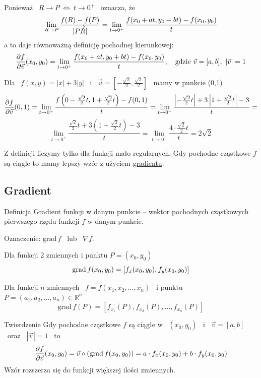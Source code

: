 Ponieważ \ $ R \to P \ \Leftrightarrow \ t \to 0^+ $ \ oznacza, że
\[ \lim_{R \to P} \frac{f(R) - f(P)}{|\overrightarrow{PR}|} = \lim_{t \to 0^+} \frac{f(x_0 + at, y_0 + bt) - f(x_0, y_0)}{t} \]
a to daje równoważną definicję pochodnej kierunkowej:
\[ \frac{\partial f}{\partial \vec{v}} (x_0, y_0) = \lim_{t \to 0^+} \frac{f(x_0 + at, y_0 + bt) - f(x_0, y_0)}{t}, \quad \text{gdzie} \ \vec{v} = [a,b], \ |\vec{v}| = 1 \]

\begin{przyklad}
    Dla \ $ f(x,y) = |x| + 3|y| $ \ i \ $ \vec{v} = \left[ -\frac{\sqrt{2}}{2}, \frac{\sqrt{2}}{2} \right] $ \ mamy w punkcie (0,1)
    \[ \frac{\partial f}{\partial \vec{v}} (0,1) = \lim_{t \to 0^+} \frac{f \left( 0 - \frac{\sqrt{2}}{2}t, 1 + \frac{\sqrt{2}}{2}t \right) - f(0,1)}{t}
    = \lim_{t \to 0^+} \frac{ \left| -\frac{\sqrt{2}}{2}t \right| + 3 \left| 1 + \frac{\sqrt{2}}{2}t \right| - 3 }{t} = \]
    \[ \lim_{t \to 0^+} \frac{ \frac{\sqrt{2}}{2}t + 3 \left( 1 + \frac{\sqrt{2}}{2}t \right) - 3 }{t} = \lim_{t \to 0^+} \frac{4 \cdot \frac{\sqrt{2}}{2}t}{t} = 2 \sqrt{2} \]
\end{przyklad}

Z definicji liczymy tylko dla funkcji mało regularnych. Gdy pochodne cząstkowe $f$ są ciągle to mamy lepszy wzór z użyciem \underline{gradientu}.

\subsection{Gradient}

\begin{tw}{Definicja}
    Gradient funkcji w danym punkcie -- wektor pochodnych cząstkowych pierwszego rzędu funkcji $f$ w danym punkcie.

    Oznaczenie: $ \text{grad}\, f$ \ lub \ $ \nabla f $.

    Dla funkcji 2 zmiennych i punktu $ P = (x_0, y_0) $
    \[ \text{grad}\, f(x_0, y_0) = [f_x(x_0, y_0), f_y(x_0, y_0)] \]

    Dla funkcji $n$ zmiennych \ $ f = f(x_1, x_2, ..., x_n) $ \ i punktu \ $ P = (a_1, a_2, ..., a_n) \in \mathbb{R}^n $
    \[ \text{grad} \, f(P) = [f_{x_1}(P), f_{x_2}(P), ..., f_{x_n}(P)] \]
\end{tw}

\begin{tw}{Twierdzenie}
    Gdy pochodne cząstkowe $f$ są ciągłe w \ $ (x_0, y_0) $ \ i \ $ \vec{v} = [a,b] $ \ oraz \ $ |\vec{v}| = 1 $ \ to
    \[ \frac{\partial f}{\partial \vec{v}} (x_0, y_0) = \vec{v} \circ (\text{grad} \, f(x_0, y_0)) = a \cdot f_x(x_0, y_0) + b \cdot f_y(x_0, y_0) \]
    Wzór rozszerza się do funkcji większej ilości zmiennych.    
\end{tw}

